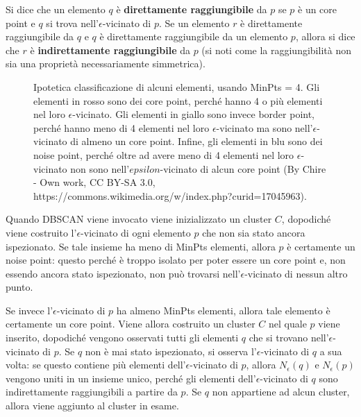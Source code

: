 \documentclass[a4paper, 12pt]{report}
\begin{document}
				Si dice che un elemento $q$ è \textbf{direttamente raggiungibile}
				da $p$ se $p$ è un core point e $q$ si trova nell'$\epsilon$-vicinato
				di $p$. Se un elemento $r$ è direttamente raggiungibile da $q$ e $q$
				è direttamente raggiungibile da un elemento $p$, allora si dice che
				$r$ è \textbf{indirettamente raggiungibile} da $p$ (si noti come
				la raggiungibilità non sia una proprietà necessariamente simmetrica).

				\begin{figure}[H]
					\centering
					
					\caption{Ipotetica classificazione di alcuni elementi, usando
					MinPts = 4. Gli elementi in rosso sono dei core point, perché
					hanno 4 o più elementi nel loro $\epsilon$-vicinato. Gli elementi
					in giallo sono invece border point, perché hanno meno di 4 elementi
					nel loro $\epsilon$-vicinato ma sono nell'$\epsilon$-vicinato di
					almeno un core point. Infine, gli elementi in blu sono dei
					noise point, perché oltre ad avere meno di 4 elementi nel loro
					$\epsilon$-vicinato non sono nell'$epsilon$-vicinato di alcun
					core point (By Chire - Own work, CC BY-SA 3.0,
					https://commons.wikimedia.org/w/index.php?curid=17045963).}
					\label{fig:dbscan-illustration}
				\end{figure}

				Quando DBSCAN viene invocato viene inizializzato un cluster
				$C$, dopodiché viene costruito l'$\epsilon$-vicinato di ogni
				elemento $p$ che non sia stato ancora ispezionato. Se tale
				insieme ha meno di MinPts elementi, allora $p$ è certamente
				un noise point: questo perché è troppo isolato per poter
				essere un core point e, non essendo ancora stato ispezionato,
				non può trovarsi nell'$\epsilon$-vicinato di nessun altro punto.

				Se invece l'$\epsilon$-vicinato di $p$ ha almeno MinPts
				elementi, allora tale elemento è certamente un core point.
				Viene allora costruito un cluster $C$ nel quale $p$ viene
				inserito, dopodiché vengono osservati tutti gli elementi
				$q$ che si trovano nell'$\epsilon$-vicinato di $p$.
				Se $q$ non è mai stato ispezionato, si osserva
				l'$\epsilon$-vicinato di $q$ a sua volta: se questo
				contiene più elementi dell'$\epsilon$-vicinato di $p$,
				allora $N_{\epsilon}(q)$ e $N_{\epsilon}(p)$ vengono
				uniti in un insieme unico, perché gli elementi
				dell'$\epsilon$-vicinato di $q$ sono indirettamente
				raggiungibili a partire da $p$. Se $q$ non appartiene
				ad alcun cluster, allora viene aggiunto al cluster in esame.
\end{document}
